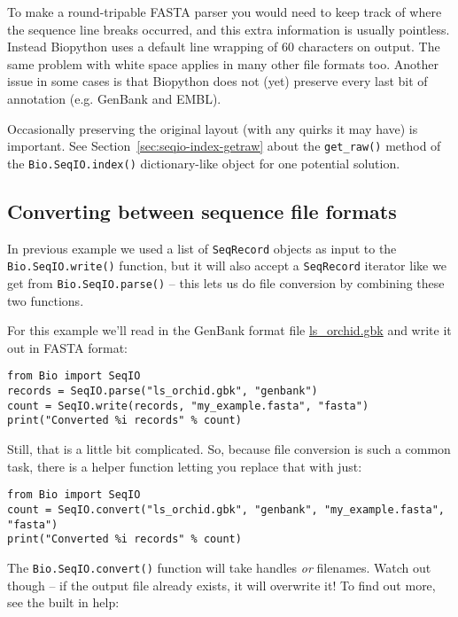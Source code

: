 \documentclass{report}
\begin{document}
To make a round-tripable FASTA parser you would need to keep track of where the
sequence line breaks occurred, and this extra information is usually pointless.
Instead Biopython uses a default line wrapping of $60$ characters on output.
The same problem with white space applies in many other file formats too.
Another issue in some cases is that Biopython does not (yet) preserve every
last bit of annotation (e.g. GenBank and EMBL).

Occasionally preserving the original layout (with any quirks it may have) is
important. See Section~\ref{sec:seqio-index-getraw} about the \verb|get_raw()|
method of the \verb|Bio.SeqIO.index()| dictionary-like object for one potential
solution.

\subsection{Converting between sequence file formats}
\label{sec:SeqIO-conversion}

In previous example we used a list of \verb|SeqRecord| objects as input to the \verb|Bio.SeqIO.write()| function, but it will also accept a \verb|SeqRecord| iterator like we get from \verb|Bio.SeqIO.parse()| -- this lets us do file conversion by combining these two functions.

For this example we'll read in the GenBank format file \href{http://biopython.org/DIST/docs/tutorial/examples/ls_orchid.gbk}{ls\_orchid.gbk} and write it out in FASTA format:

\begin{verbatim}
from Bio import SeqIO
records = SeqIO.parse("ls_orchid.gbk", "genbank")
count = SeqIO.write(records, "my_example.fasta", "fasta")
print("Converted %i records" % count)
\end{verbatim}

Still, that is a little bit complicated. So, because file conversion is such a
common task, there is a helper function letting you replace that with just:

\begin{verbatim}
from Bio import SeqIO
count = SeqIO.convert("ls_orchid.gbk", "genbank", "my_example.fasta", "fasta")
print("Converted %i records" % count)
\end{verbatim}

The \verb|Bio.SeqIO.convert()| function will take handles \emph{or} filenames.
Watch out though -- if the output file already exists, it will overwrite it!
To find out more, see the built in help:
\end{document}
